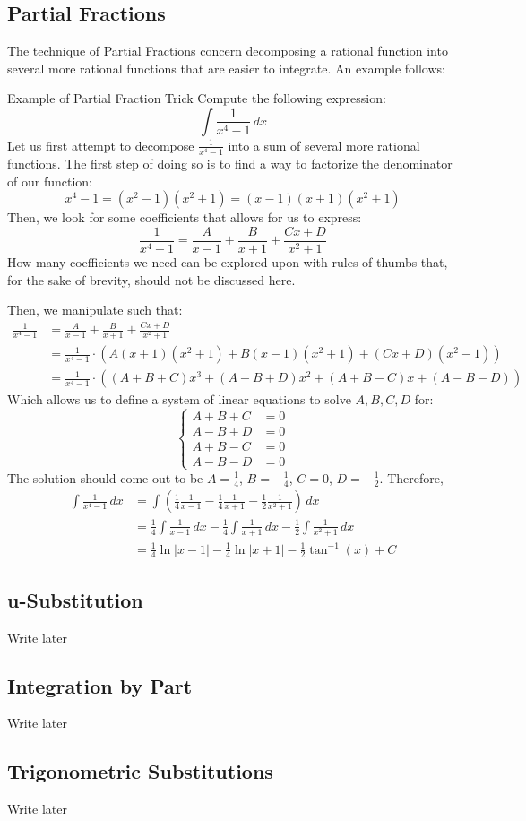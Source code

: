 \subsection{Partial Fractions}
The technique of Partial Fractions concern decomposing a rational function into several more rational functions that are easier to integrate.
An example follows:
\begin{ln-explain}{Example of Partial Fraction Trick}{}
    Compute the following expression:
    \[
        \int \frac{1}{x^4 - 1} \,dx
    \]
    \tcblower
    Let us first attempt to decompose $\frac{1}{x^4 - 1}$ into a sum of several more rational functions.
    The first step of doing so is to find a way to factorize the denominator of our function:
    \[
        x^4 - 1 = (x^2 - 1)(x^2 + 1) = (x - 1)(x + 1)(x^2 + 1)
    \]
    Then, we look for some coefficients that allows for us to express:
    \[
        \frac{1}{x^4 - 1} = \frac{A}{x-1} + \frac{B}{x+1} + \frac{Cx + D}{x^2 + 1}
    \]
    How many coefficients we need can be explored upon with rules of thumbs that, for the sake of brevity, should not be discussed here.

    Then, we manipulate such that:
    \begin{align*}
        \frac{1}{x^4 - 1}
        &= \frac{A}{x-1} + \frac{B}{x+1} + \frac{Cx + D}{x^2 + 1} \\
        &= \frac{1}{x^4 - 1} \cdot (A (x + 1)(x^2 + 1) + B (x - 1)(x^2 + 1) + (Cx + D)(x^2 - 1)) \\
        &= \frac{1}{x^4 - 1} \cdot ((A + B + C) x^3 + (A - B + D) x^2 + (A + B - C) x + (A - B - D))
    \end{align*}
    Which allows us to define a system of linear equations to solve $A, B, C, D$ for:
    \[
        \begin{cases}
            A + B + C &= 0 \\
            A - B + D &= 0 \\
            A + B - C &= 0 \\
            A - B - D &= 0
        \end{cases}
    \]
    The solution should come out to be $A = \frac{1}{4}$, $B = -\frac{1}{4}$, $C = 0$, $D = -\frac{1}{2}$.
    Therefore,
    \begin{align*}
        \int \frac{1}{x^4 - 1} \,dx
        &= \int (\frac{1}{4} \frac{1}{x-1} - \frac{1}{4} \frac{1}{x+1} - \frac{1}{2} \frac{1}{x^2+1}) \,dx \\
        &= \frac{1}{4} \int \frac{1}{x-1}\,dx - \frac{1}{4} \int \frac{1}{x+1}\,dx - \frac{1}{2} \int \frac{1}{x^2+1}\,dx \\
        &= \frac{1}{4} \ln{|x-1|} - \frac{1}{4} \ln{|x+1|} - \frac{1}{2} \tan^{-1}(x) + C
    \end{align*}
\end{ln-explain}

\subsection{u-Substitution}
Write later

\subsection{Integration by Part}
Write later

\subsection{Trigonometric Substitutions}
Write later
